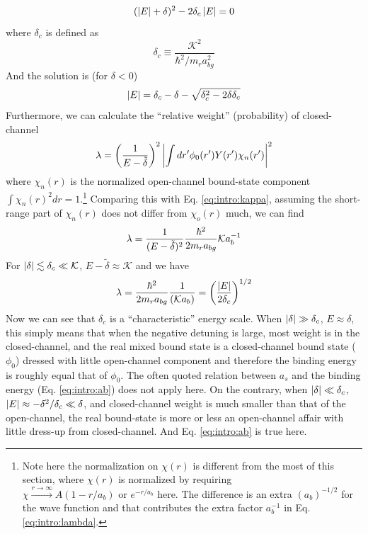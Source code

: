 \begin{equation}
(\left\lvert{E}\right\rvert+\delta)^{2}-2\delta_{c}\left\lvert{E}\right\rvert=0 
\end{equation}
where $\delta_{c}$ is defined as 
\begin{equation}\label{eq:intro:deltaC}
\delta_{c}\equiv\frac{\mathcal{K}^{2}}{\hbar^{2}/m_{r}a_{bg}^{2}}
\end{equation}
And the solution is  (for $\delta<0$)
\begin{equation}
\left\lvert{E}\right\rvert=\delta_{c}-\delta-\sqrt{\delta_{c}^{2}-2\delta\delta_{c}}
\end{equation}
Furthermore, we can calculate the ``relative weight'' (probability) of closed-channel 
\begin{equation}
\lambda=\left(\frac{1}{E-\tilde\delta}\right)^{2}\left\lvert{\int{}dr'\phi_{0}(r')Y(r')\chi_{n}(r')}\right\rvert^{2}
\end{equation}
where $\chi_{n}(r)$ is the normalized open-channel bound-state component $\int{}\chi_{n}(r)^{2}dr=1$.\footnote{Note here the normalization on $\chi(r)$ is different from the most of this section, where $\chi(r)$ is normalized by  requiring $\chi{}\overset{r\rightarrow\infty}\rightarrow{}A(1-r/a_{b})\text{ or }e^{-r/a_{b}} $ here. The difference is an extra $(a_{b})^{-1/2}$ for the wave function and that contributes the extra factor $a_{b}^{-1}$ in Eq. \ref{eq:intro:lambda}.}  Comparing this with Eq. \ref{eq:intro:kappa}, assuming the short-range part of $\chi_{n}(r)$ does not differ from $\chi_{o}(r)$ much, we can find 
\begin{equation}\label{eq:intro:lambda}
\lambda=\frac{1}{(E-\tilde\delta)^{2}}\frac{\hbar^{2}}{2m_{r}a_{bg}}\mathcal{K}a_{b}^{-1}
\end{equation}
For $\left\lvert{\delta}\right\rvert\lesssim\delta_{c}\ll\mathcal{K}$, $E-\tilde\delta\approx\mathcal{K}$ and we have 
\begin{equation}
\lambda=\frac{\hbar^{2}}{2m_{r}a_{bg}}\frac{1}{(\mathcal{K}a_{b})}=\left(\frac{\left\lvert{E}\right\rvert}{2\delta_{c}}\right)^{1/2}
\end{equation}
Now we can see that  $\delta_{c}$ is a ``characteristic'' energy scale. When $\left\lvert{\delta}\right\rvert\gg\delta_{c}$, $E\approx\delta$, this simply means that when the negative detuning is large, most weight is in the closed-channel, and the real mixed bound state is a closed-channel bound state ($\phi_{0}$) dressed with little open-channel component and therefore the binding energy is roughly equal that of $\phi_{0}$.  The often quoted relation between $a_{s}$ and the binding energy (Eq. \ref{eq:intro:ab}) does not apply here.  On the contrary, when $\left\lvert{\delta}\right\rvert\ll\delta_{c}$, $\left\lvert{E}\right\rvert\approx-\delta^{2}/\delta_{c}\ll\delta$,  and closed-channel weight is much smaller than that of the open-channel, the real bound-state is more or less an open-channel affair with little dress-up from closed-channel.  And Eq. \ref{eq:intro:ab} is true here. %

